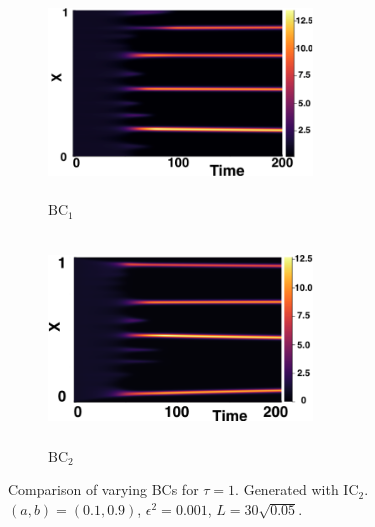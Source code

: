 \begin{figure}[H]
    \centering
    \begin{subfigure}[b]{0.45\textwidth}
        \centering
        \includegraphics[width=7cm,height=5.5cm]{ic21.png}
        \caption{$\text{BC}_1$}
        \label{}
    \end{subfigure}
    \hfill
    \begin{subfigure}[b]{0.45\textwidth}
        \centering
        \includegraphics[width=7cm,height=5.5cm]{bc1.png}
        \caption{$\text{BC}_2$}
        \label{}
    \end{subfigure}
    \caption{Comparison of varying BCs for $\tau=1$. Generated with $\text{IC}_2$. $(a,b)=(0.1,0.9)$, $\epsilon^2=0.001$, $L=30\sqrt{0.05}$.}
    \label{fig:bctau2}
\end{figure}

